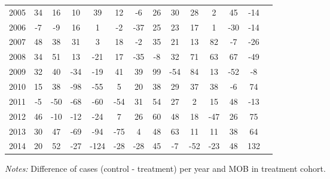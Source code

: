 \begin{table}[H]
\begin{threeparttable}
{\begin{tabular}{l*{13}{c}}
2005        &          34&          16&          10&          39&          12&          -6&          26&          30&          28&           2&          45&         -14\\
2006        &          -7&          -9&          16&           1&          -2&         -37&          25&          23&          17&           1&         -30&         -14\\
2007        &          48&          38&          31&           3&          18&          -2&          35&          21&          13&          82&          -7&         -26\\
2008        &          34&          51&          13&         -21&          17&         -35&          -8&          32&          71&          63&          67&         -49\\
2009        &          32&          40&         -34&         -19&          41&          39&          99&         -54&          84&          13&         -52&          -8\\
2010        &          15&          38&         -98&         -55&           5&          20&          38&          29&          37&          38&          -6&          74\\
2011        &          -5&         -50&         -68&         -60&         -54&          31&          54&          27&           2&          15&          48&         -13\\
2012        &          46&         -10&         -12&         -24&           7&          26&          60&          48&          18&         -47&          26&          75\\
2013        &          30&          47&         -69&         -94&         -75&           4&          48&          63&          11&          11&          38&          64\\
2014        &          20&          52&         -27&        -124&         -28&         -28&          45&          -7&         -52&         -23&          48&         132\\
 \bottomrule \end{tabular} } \begin{tablenotes} \item \scriptsize \emph{Notes:} Difference of cases (control - treatment) per year and MOB in treatment cohort. \end{tablenotes} \end{threeparttable} \end{table} 
